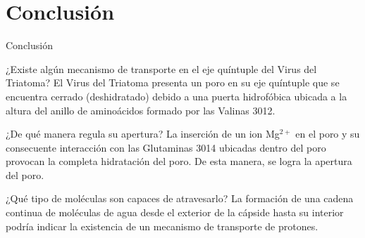 \documentclass[8pt]{beamer}
\begin{document}
%
%

\section{Conclusión}
\begin{frame}{Conclusión}
\begin{block}{¿Existe algún mecanismo de transporte en el eje quíntuple del Virus del Triatoma?}
El Virus del Triatoma presenta un poro en su eje quíntuple que se encuentra cerrado (deshidratado) debido a una puerta hidrofóbica ubicada a la altura del anillo de aminoácidos formado por las Valinas 3012.
\end{block}
\begin{block}{¿De qué manera regula su apertura?}
La inserción de un ion Mg$^{2+}$ en el poro y su consecuente interacción con las Glutaminas 3014 ubicadas dentro del poro provocan la completa hidratación del poro. De esta manera, se logra la apertura del poro.
\end{block}
\begin{block}{¿Qué tipo de moléculas son capaces de atravesarlo?}
La formación de una cadena continua de moléculas de agua desde el exterior de la cápside hasta su interior podría indicar la existencia de un mecanismo de transporte de protones.
\end{block}
\end{frame}
\end{document}
